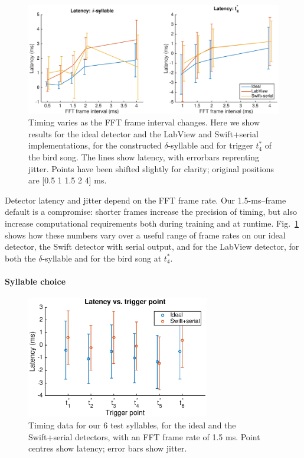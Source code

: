 \documentclass[10pt,letterpaper]{article}
\newcommand\fig[1]{Fig.~\ref{#1}}
\renewcommand{\subsubsection}[1]{\paragraph{#1}}
\begin{document}
\begin{figure}
  \includegraphics[width=\textwidth]{TimingVsFrame}
  \caption{Timing varies as the FFT frame interval changes.  Here we show results for the ideal detector and the LabView and Swift+serial implementations, for the constructed $\delta$-syllable and for trigger $t^*_4$ of the bird song.  The lines show latency, with errorbars reprenting jitter.  Points have been shifted slightly for clarity; original positions are [0.5 1 1.5 2 4] ms.}
  \label{fig:TimingVsFrame}
\end{figure}

Detector latency and jitter depend on the FFT frame rate.  Our 1.5-ms--frame default is a compromise: shorter frames increase the precision of timing, but also increase computational requirements both during training and at runtime.  \fig{fig:TimingVsFrame} shows how these numbers vary over a useful range of frame rates on our ideal detector, the Swift detector with serial output, and for the LabView detector, for both the $\delta$-syllable and for the bird song at $t^*_4$.

\subsubsection{Syllable choice}

\begin{figure}
  \begin{center}
    \includegraphics[width=8cm]{TimingVsSyllable}
  \end{center}
  \caption{Timing data for our 6 test syllables, for the ideal and the Swift+serial detectors, with an FFT frame rate of 1.5 ms.  Point centres show latency; error bars show jitter.}
  \label{fig:TimingVsSyllable}
\end{figure}
\end{document}
